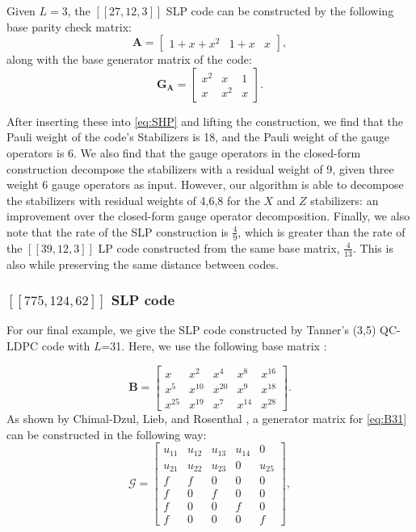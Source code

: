 \documentclass[conference]{IEEEtran}
\newcommand{\llbr}{[\![}
\newcommand{\rrbr}{]\!]}
\begin{document}
Given $L=3$, the $\llbr 27,12,3 \rrbr$ SLP code can be constructed by the following base parity check matrix:
\begin{equation} 
\label{eq:A_27} 
\boldsymbol{A}=
\begin{bmatrix}
    1+x+x^2&1+x&x
\end{bmatrix},
\end{equation}
along with the base generator matrix of the code:
\begin{equation} \label{eq:GA_27} \boldsymbol{G}_{\boldsymbol{A}}=
\begin{bmatrix}
   x^2&x&1\\
   x&x^2&x
\end{bmatrix}.  
\end{equation}

After inserting these into \eqref{eq:SHP} and lifting the construction, we find that the Pauli weight of the code's Stabilizers is 18, and the Pauli weight of the gauge operators is 6. We also find that the gauge operators in the closed-form construction decompose the stabilizers with a residual weight of 9, given three weight 6 gauge operators as input. However, our algorithm is able to decompose the stabilizers with residual weights of  4,6,8 for the $X$ and $Z$ stabilizers: an improvement over the closed-form gauge operator decomposition. Finally, we also note that the rate of the SLP construction is $\frac{4}{9}$, which is greater than the rate of the $ \left[\left[39,12,3\right]\right]$  LP code constructed from the same base matrix, $\frac{4}{13}$. This is also while preserving the same distance between codes. 
\subsubsection{$\llbr 775,124,62 \rrbr$ SLP code}
For our final example, we give the SLP code constructed by Tanner's (3,5) QC-LDPC code with $L$=31. Here, we use the following base matrix \cite{raveendran2022finite}:


\begin{equation} 
\label{eq:B31} 
\boldsymbol{B}=
\begin{bmatrix}
    x&x^{2}&x^{4}&x^{8}&x^{16}\\
    x^{5}&x^{10}&x^{20}&x^{9}&x^{18}\\
    x^{25}&x^{19}&x^{7}&x^{14}&x^{28}
\end{bmatrix}. 
\end{equation}
As shown by Chimal-Dzul, Lieb, and Rosenthal \cite{chimal2022generator}, a generator matrix for \eqref{eq:B31} can be constructed in the following way:
\begin{equation} \label{eq:G31} \boldsymbol{\mathcal{G}}=
\begin{bmatrix}
    u_{11}&u_{12}&u_{13}&u_{14}&0\\
    u_{21}&u_{22}&u_{23}&0&u_{25}\\
    f&f&0&0&0\\
    f&0&f&0&0\\
    f&0&0&f&0\\
     f&0&0&0&f
\end{bmatrix},
\end{equation}
\end{document}
